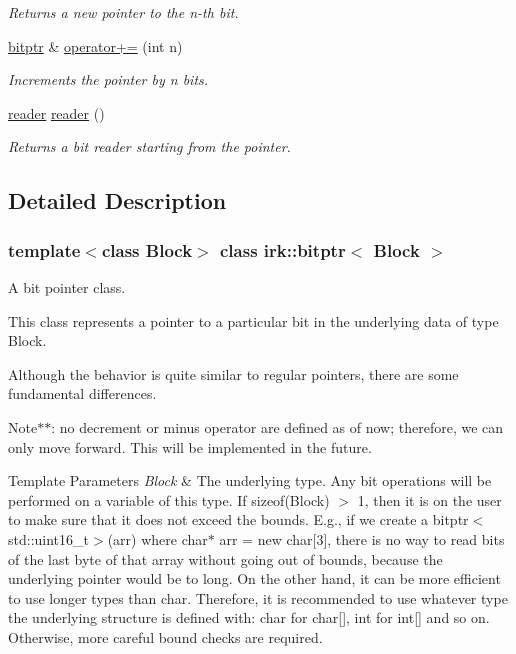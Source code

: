 \begin{DoxyCompactItemize}
\begin{DoxyCompactList}\small\item\em Returns a new pointer to the {\ttfamily n}-\/th bit. \end{DoxyCompactList}\item 
\mbox{\hyperlink{classirk_1_1bitptr}{bitptr}} \& \mbox{\hyperlink{classirk_1_1bitptr_a9fcc393a8789c4500391ff3ff2a9fff7}{operator+=}} (int n)
\begin{DoxyCompactList}\small\item\em Increments the pointer by {\ttfamily n} bits. \end{DoxyCompactList}\item 
\mbox{\hyperlink{structirk_1_1bitptr_1_1reader}{reader}} \mbox{\hyperlink{classirk_1_1bitptr_a4505dc024807e2b041ffdc910fae1189}{reader}} ()
\begin{DoxyCompactList}\small\item\em Returns a bit reader starting from the pointer. \end{DoxyCompactList}\end{DoxyCompactItemize}


\subsection{Detailed Description}
\subsubsection*{template$<$class Block$>$\newline
class irk\+::bitptr$<$ Block $>$}

A bit pointer class. 

This class represents a pointer to a particular bit in the underlying data of type {\ttfamily Block}.

Although the behavior is quite similar to regular pointers, there are some fundamental differences.

Note$\ast$$\ast$\+: no decrement or minus operator are defined as of now; therefore, we can only move forward. This will be implemented in the future.


\begin{DoxyTemplParams}{Template Parameters}
{\em Block} & The underlying type. Any bit operations will be performed on a variable of this type. If {\ttfamily sizeof(\+Block) $>$ 1}, then it is on the user to make sure that it does not exceed the bounds. E.\+g., if we create a {\ttfamily bitptr$<$std\+::uint16\+\_\+t$>$(arr)} where {\ttfamily char$\ast$ arr = new char\mbox{[}3\mbox{]}}, there is no way to read bits of the last byte of that array without going out of bounds, because the underlying pointer would be to long. On the other hand, it can be more efficient to use longer types than {\ttfamily char}. Therefore, it is recommended to use whatever type the underlying structure is defined with\+: {\ttfamily char} for {\ttfamily char\mbox{[}\mbox{]}}, {\ttfamily int} for {\ttfamily int\mbox{[}\mbox{]}} and so on. Otherwise, more careful bound checks are required. \\
\hline
\end{DoxyTemplParams}


